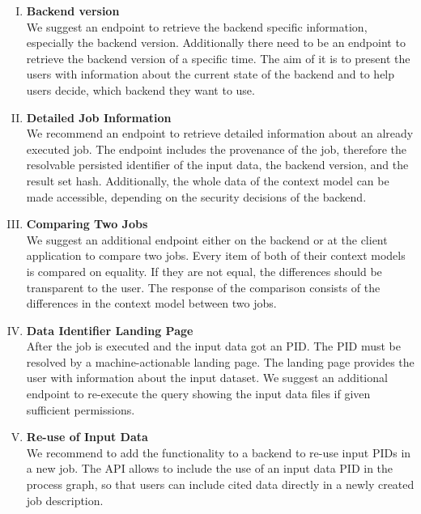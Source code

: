 \documentclass[draft,final]{vutinfth} %
\newcommand{\bgoesswein}[1]{{\color{blue}#1}}
\begin{document}
\begin{enumerate}[I.]
\item \textbf{Backend version} \\
	We suggest an endpoint to retrieve the backend specific information, especially the backend version. Additionally there need to be an endpoint to retrieve the backend version of a specific time. The aim of it is to present the users with information about the current state of the backend and to help users decide, which backend they want to use. 

\item \textbf{Detailed Job Information} \\
	We recommend an endpoint to retrieve detailed information about an already executed job. The endpoint includes the provenance of the job, therefore the resolvable persisted identifier of the input data, the backend version, and the result set hash. Additionally, the whole data of the context model can be made accessible, depending on the security decisions of the backend.  
\item \textbf{Comparing Two Jobs} \\
	We suggest an additional endpoint either on the backend or at the client application to compare two jobs. Every item of both of their context models is compared on equality. If they are not equal, the differences should be transparent to the user. The response of the comparison consists of the differences in the context model between two jobs.
\item \textbf{Data Identifier Landing Page} \\
	After the job is executed and the input data got an PID. The PID must be resolved by a \bgoesswein{machine-actionable} landing page. The landing page provides the user with information about the input dataset. We suggest an additional endpoint to re-execute the query showing the input data files if given sufficient permissions.
    
\item \textbf{Re-use of Input Data} \\
	We recommend to add the functionality to a backend to re-use input PIDs in a new job. The API allows to include the use of an input data PID in the process graph, so that users can include cited data directly in a newly created job description.   
\end{enumerate}
\end{document}
